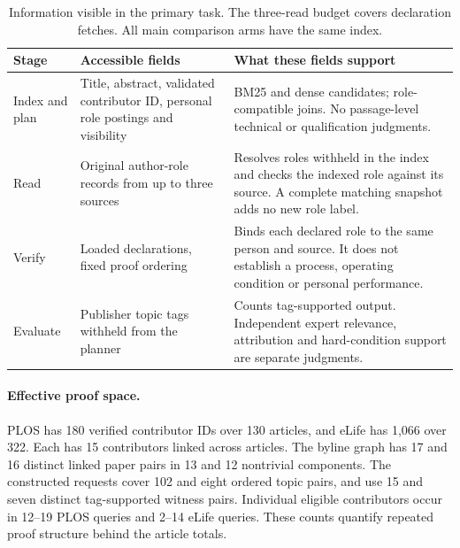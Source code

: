\documentclass[sigconf,natbib=true,anonymous=true,pbalance=true]{acmart}
\begin{document}
\begin{table}[t]
\centering\small
\caption{Information visible in the primary task. The three-read budget covers declaration fetches. All main comparison arms have the same index.}
\label{tab:visibility}
\begin{tabular}{@{}p{}p{}p{}@{}}
\toprule
Stage & Accessible fields & What these fields support \\\midrule
Index and plan & Title, abstract, validated contributor ID, personal role postings and visibility & BM25 and dense candidates; role-compatible joins. No passage-level technical or qualification judgments. \\
Read & Original author-role records from up to three sources & Resolves roles withheld in the index and checks the indexed role against its source. A complete matching snapshot adds no new role label. \\
Verify & Loaded declarations, fixed proof ordering & Binds each declared role to the same person and source. It does not establish a process, operating condition or personal performance. \\
Evaluate & Publisher topic tags withheld from the planner & Counts tag-supported output. Independent expert relevance, attribution and hard-condition support are separate judgments. \\
\bottomrule
\end{tabular}
\end{table}

\paragraph{Effective proof space.}
PLOS has 180 verified contributor IDs over 130 articles, and eLife has 1,066 over 322. Each has 15 contributors linked across articles. The byline graph has 17 and 16 distinct linked paper pairs in 13 and 12 nontrivial components. The constructed requests cover 102 and eight ordered topic pairs, and use 15 and seven distinct tag-supported witness pairs. Individual eligible contributors occur in 12--19 PLOS queries and 2--14 eLife queries. These counts quantify repeated proof structure behind the article totals.
\end{document}
